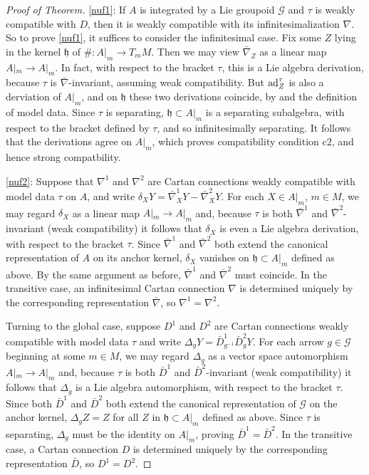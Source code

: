 \documentclass[leqno,12pt]{amsart} %
\begin{document}
\begin{proof}[Proof of Theorem]
  \eqref{nuf1}: If $A$ is integrated by a Lie groupoid ${\mathcal G} $ and $\tau$ is
  weakly compatible with $D$, then it is weakly compatible with its infinitesimalization
  $\nabla $. So to prove \eqref{nuf1}, it suffices to consider the infinitesimal case. Fix
  some $Z$ lying in the kernel ${\mathfrak h}$ of $\# \colon A|_m \rightarrow T_mM$. Then
  we may view $\bar\nabla_Z$ as a linear map $A|_m \rightarrow A|_m$. In fact, with
  respect to the bracket $\tau $, this is a Lie algebra derivation, because $\tau $ is
  $\bar\nabla $-invariant, assuming weak compatibility. But $\operatorname{ad}_Z^\tau$ is also a
  derviation of $A|_m$, and on ${\mathfrak h} $ these two derivations coincide, by
   and the definition of model data. Since $\tau $ is separating,
  ${\mathfrak h} \subset A|_m$ is a separating subalgebra, with respect to the bracket
  defined by $\tau $, and so infinitesimally separating. It follows that the derivations
  agree on $A|_m$, which proves compatibility condition c2, and hence strong compatbility.

  \eqref{nuf2}: Suppose that $\nabla^1$ and $\nabla^2$ are Cartan connections weakly
  compatible with model data $\tau$ on $A$, and write
  $\delta_XY = \bar\nabla^1_XY - \bar\nabla^2_XY$. For each $X \in A|_m$, $m \in M$, we
  may regard $\delta_X$ as a linear map $A|_m \rightarrow A|_m$ and, because $\tau $ is
  both $\bar\nabla^1$ and $\bar\nabla^2$-invariant (weak compatibility) it follows that
  $\delta_X$ is even a Lie algebra derivation, with respect to the bracket $\tau $. Since
  $\bar\nabla^1$ and $\bar\nabla^2$ both extend the canonical representation of $A$ on its
  anchor kernel, $\delta_X$ vanishes on ${\mathfrak h} \subset A|_m$ defined as above. By
  the same argument as before, $\bar\nabla^1$ and $\bar\nabla^2$ must coincide. In the
  transitive case, an infinitesimal Cartan connection $\nabla$ is determined uniquely by
  the corresponding representation $\bar\nabla$, so $\nabla^1 = \nabla^2$.

  Turning to the global case, suppose $ D^1$ and $D^2$ are Cartan connections weakly
  compatible with model data $\tau $ and write
  $\Delta_gY = \bar D^1_{g^{-1}} \bar D^2_g Y$. For each arrow $g \in {\mathcal G} $
  beginning at some $m \in M$, we may regard $\Delta_g$ as a vector space automorphism
  $A|_m \rightarrow A|_m$ and, because $\tau $ is both $\bar D^1$ and $\bar D^2$-invariant
  (weak compatibility) it follows that $\Delta_g$ is a Lie algebra automorphism, with
  respect to the bracket $\tau$. Since both $\bar D^1$ and $\bar D^2$ both extend the
  canonical representation of $\mathcal G$ on the anchor kernel, $\Delta_gZ = Z$ for all
  $Z$ in ${\mathfrak h} \subset A|_m$ defined as above. Since $\tau $ is separating,
  $\Delta_g$ must be the identity on $A|_m$, proving $\bar D^1 = \bar D^2$. In the
  transitive case, a Cartan connection $D$ is determined uniquely by the corresponding
  representation $\bar D$, so $D^1 = D^2$.
\end{proof}
\end{document}
